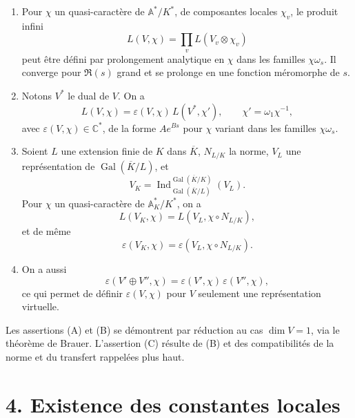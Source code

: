 \documentclass[10pt]{article}
\newcommand{\C}{\mathbb C}
\newcommand{\Gal}{\operatorname{Gal}}
\newcommand{\Ind}{\operatorname{Ind}}
\begin{document}
\begin{enumerate}[label=(\Alph*)]
\item Pour \(\chi\) un quasi-caractère de \(\mathbb A^*/K^*\), de composantes locales \(\chi_v\), le produit infini
\[
L(V,\chi)=\prod_v L(V_v\otimes\chi_v)
\]
peut être défini par prolongement analytique en \(\chi\) dans les familles \(\chi\omega_s\). Il converge pour \(\Re(s)\) grand et se prolonge en une fonction méromorphe de \(s\).

\item Notons \(V^*\) le dual de \(V\). On a
\[
L(V,\chi)=\varepsilon(V,\chi)\,L(V^*,\chi'),
\qquad \chi'=\omega_1\chi^{-1},
\]
avec \(\varepsilon(V,\chi)\in\C^*\), de la forme \(Ae^{Bs}\) pour \(\chi\) variant dans les familles \(\chi\omega_s\).

\item Soient \(L\) une extension finie de \(K\) dans \(\overline K\), \(N_{L/K}\) la norme, \(V_L\) une représentation de \(\Gal(\overline K/L)\), et
\[
V_K=\Ind_{\Gal(\overline K/L)}^{\Gal(\overline K/K)}(V_L).
\]
Pour \(\chi\) un quasi-caractère de \(\mathbb A_K^*/K^*\), on a
\[
L(V_K,\chi)=L(V_L,\chi\circ N_{L/K}),
\]
et de même
\[
\varepsilon(V_K,\chi)=\varepsilon(V_L,\chi\circ N_{L/K}).
\]
\item On a aussi
\[
\varepsilon(V'\oplus V'',\chi)=\varepsilon(V',\chi)\,\varepsilon(V'',\chi),
\]
ce qui permet de définir \(\varepsilon(V,\chi)\) pour \(V\) seulement une représentation virtuelle.
\end{enumerate}
Les assertions (A) et (B) se démontrent par réduction au cas \(\dim V=1\), via le théorème de Brauer. L'assertion (C) résulte de (B) et des compatibilités de la norme et du transfert rappelées plus haut.

\section*{4. Existence des constantes locales}
\end{document}
